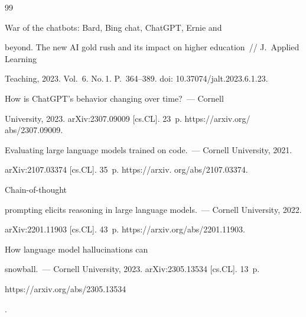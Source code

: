 {\small\frenchspacing


{%




\begin{thebibliography}{99}







 War of the chatbots: Bard, Bing chat, ChatGPT, Ernie and 


beyond. The new AI gold rush and its impact on higher education~/\!\!/ J.~Applied Learning 


Teaching, 2023. Vol.~6. No.\,1. P.~364--389. doi: 10.37074\!/\!jalt.2023.6.1.23.




 How is ChatGPT's behavior changing over time?~--- Cornell 


University, 2023. arXiv:2307.09009 [cs.CL]. 23~p. {\sf https://arxiv.org/ abs/2307.09009}. 






Evaluating large language models trained on code.~--- Cornell University, 2021. 


arXiv:2107.03374 [cs.CL]. 35~p. {\sf https://arxiv. org/abs/2107.03374}.




 Chain-of-thought 


prompting elicits reasoning in large language models.~--- Cornell University, 2022. 


arXiv:2201.11903 [cs.CL]. 43~p. {\sf https://arxiv.org/abs/2201.11903}.




 How language model hallucinations can 


snowball.~--- Cornell University, 2023. arXiv:2305.13534 [cs.CL].  13~p. {\sf 


https://arxiv.org/abs/2305.13534}.



\end{thebibliography}}}
